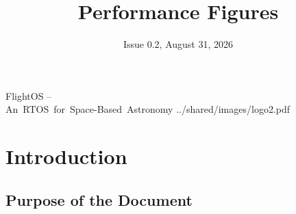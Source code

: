 \title{Performance Figures}
\def \documentid {FLIGHTOS-UVIE-PERF-001}
\date{Issue 0.2, August 31, 2026}

\newcommand\affil[1]{\textsuperscript#1}

\def\preparedby {Armin Luntzer\affil{1}}
\def\checkedby {Roland Ottensamer\affil{1}}
\def\approvedby {Franz Kerschbaum\affil{1}}
\def\authorisedby{-}

\def\affiliations{
	\affil{1} Department of Astrophysics, University of Vienna
}








\usepackage{vhistory}
\usepackage[
	backend=biber,
	defernumbers,
	natbib=true,
	style=numeric, %
	sorting=none,
	giveninits=true,
]{biblatex}


\usepackage{listings}


\usepackage{appendix}



\lstset{style=customc} 

\setmainfont{MyriadPro-SemiCondensed}
\uvietitlepage%
{FlightOS --\\\mbox{An RTOS for Space-Based Astronomy}}%
{\doctitle}%
{../shared/images/logo2.pdf}{}
\setmainfont{MyriadPro}

\approvalpage

\tableofcontents
\newpage



\begin{versionhistory}
\end{versionhistory}


\chapter{Introduction}

\section{Purpose of the Document}

